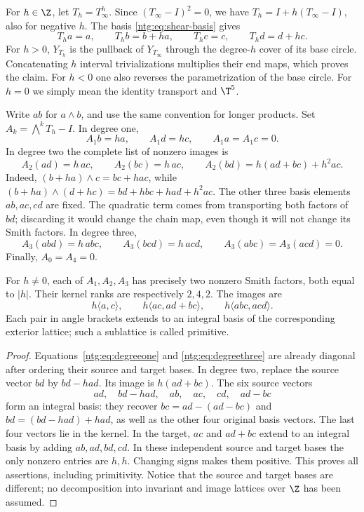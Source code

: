 For $h\in\Z$, let $T_h=T_\infty^h$. Since
$(T_\infty-I)^2=0$, we have $T_h=I+h(T_\infty-I)$, also for
negative $h$. The basis \eqref{ntg:eq:shear-basis} gives
\[
 T_ha=a,\qquad T_hb=b+ha,\qquad
 T_hc=c,\qquad T_hd=d+hc.
\]
For $h>0$, $Y_{T_h}$ is the pullback of $Y_{T_\infty}$ through
the degree-$h$ cover of its base circle. Concatenating $h$ interval
trivializations multiplies their end maps, which proves the claim.
For $h<0$ one also reverses the parametrization of the base circle.
For $h=0$ we simply mean the identity transport and $\T^5$.

Write $ab$ for $a\wedge b$, and use the same convention for longer
products. Set $A_k=\bigwedge^kT_h-I$. In degree one,
\begin{equation}\label{ntg:eq:degreeone}
 A_1b=ha,\qquad A_1d=hc,\qquad A_1a=A_1c=0.
\end{equation}
In degree two the complete list of nonzero images is
\begin{equation}\label{ntg:eq:degreetwo}
 A_2(ad)=h\,ac,\qquad A_2(bc)=h\,ac,
 \qquad A_2(bd)=h(ad+bc)+h^2ac.
\end{equation}
Indeed, $(b+ha)\wedge c=bc+hac$, while
$(b+ha)\wedge(d+hc)=bd+hbc+had+h^2ac$.
The other three basis elements $ab,ac,cd$ are fixed. The quadratic
term comes from transporting both factors of $bd$; discarding it
would change the chain map, even though it will not change its Smith
factors. In degree three,
\begin{equation}\label{ntg:eq:degreethree}
 A_3(abd)=h\,abc,\qquad A_3(bcd)=h\,acd,
 \qquad A_3(abc)=A_3(acd)=0.
\end{equation}
Finally, $A_0=A_4=0$.

\begin{lemma}\label{ntg:lem:shear-smith}
For $h\ne0$, each of $A_1,A_2,A_3$ has precisely two nonzero
Smith factors, both equal to $|h|$. Their kernel ranks are respectively
$2,4,2$. The images are
\[
 h\langle a,c\rangle,\qquad
 h\langle ac,ad+bc\rangle,\qquad
 h\langle abc,acd\rangle.
\]
Each pair in angle brackets extends to an integral basis of the
corresponding exterior lattice; such a sublattice is called primitive.
\end{lemma}
\begin{proof}
Equations~\eqref{ntg:eq:degreeone} and \eqref{ntg:eq:degreethree} are already
diagonal after ordering their source and target bases. In degree two,
replace the source vector $bd$ by $bd-had$. Its image is
$h(ad+bc)$. The six source vectors
\[
 ad,\quad bd-had,\quad ab,\quad ac,\quad cd,\quad ad-bc
\]
form an integral basis: they recover $bc=ad-(ad-bc)$ and
$bd=(bd-had)+had$, as well as the other four original basis vectors.
The last four vectors lie in the kernel. In the target, $ac$ and
$ad+bc$ extend to an integral basis by adding $ab,ad,bd,cd$.
In these independent source and target bases the only nonzero entries
are $h,h$. Changing signs makes them positive. This proves all
assertions, including primitivity. Notice that the source and target
bases are different; no decomposition into invariant and image
lattices over $\Z$ has been assumed.
\end{proof}

